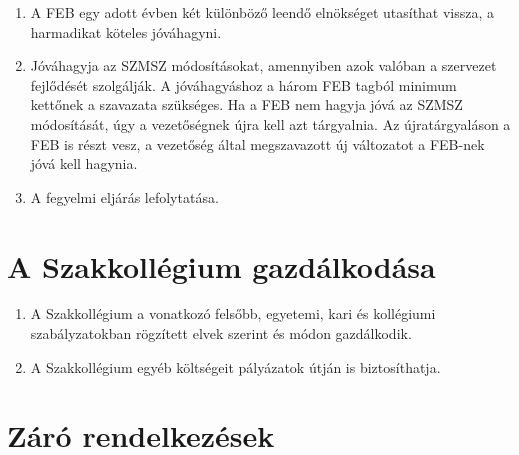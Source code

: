 \documentclass[12pt]{report}
\begin{document}
\begin{enumerate}
\begin{enumerate}
    \item A FEB egy adott évben két különböző leendő elnökséget utasíthat vissza, a harmadikat köteles jóváhagyni.
    \item Jóváhagyja az SZMSZ módosításokat, amennyiben azok valóban a szervezet fejlődését szolgálják. A jóváhagyáshoz a három FEB tagból minimum kettőnek a szavazata 
      szükséges. Ha a FEB nem hagyja jóvá az SZMSZ módosítását, úgy a vezetőségnek újra kell azt tárgyalnia. Az újratárgyaláson a FEB is részt vesz, a vezetőség által megszavazott 
      új változatot a FEB-nek jóvá kell hagynia.
    \item A fegyelmi eljárás lefolytatása.
  \end{enumerate}
\end{enumerate}


\section{A Szakkollégium gazdálkodása}

\begin{enumerate}
  \item A Szakkollégium a vonatkozó felsőbb, egyetemi, kari és kollégiumi szabályzatokban rögzített elvek szerint és módon gazdálkodik.
  \item A Szakkollégium egyéb költségeit pályázatok útján is biztosíthatja.
\end{enumerate}


\section{Záró rendelkezések}
\end{document}
